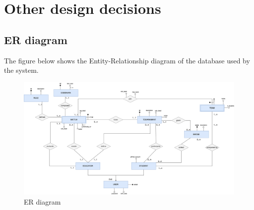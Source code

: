 \section{Other design decisions}

\subsection{ER diagram}
The figure below shows the Entity-Relationship diagram of the database used by the system.\\
\begin{figure}[H]
    \centering
    \includegraphics[width=1\textwidth]{images/ER_diagram.png}
    \caption{ER diagram}
\end{figure}
